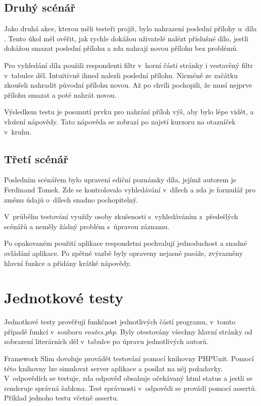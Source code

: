         \subsection{Druhý scénář}
            Jako druhá akce, kterou měli testeři projít, bylo nahrazení poslední přílohy u~díla . Tento úkol měl ověřit, jak rychle dokážou uživatelé nalézt příslušné dílo, jestli dokážou smazat poslední přílohu a zda nahrají novou přílohu bez problémů.
            
            Pro vyhledání díla použili respondenti filtr v~horní části stránky i vestavěný filtr v~tabulce děl. Intuitivně ihned nalezli poslední přílohu. Nicméně ze začátku zkoušeli nahradit původní přílohu novou. Až po chvíli pochopili, že musí nejprve přílohu smazat a poté nahrát novou.

            Výsledkem testu je posunutí prvku pro nahrání příloh výš, aby bylo lépe vidět, a vložení nápovědy. Tato nápověda se zobrazí po najetí kurzoru na otazníček v~kruhu.

        \subsection{Třetí scénář}
            Posledním scénářem bylo upravení ediční poznámky díla, jejímž autorem je Ferdinand Tomek. Zde se kontrolovalo vyhledávání v~dílech a zda je formulář pro změnu údajů o~dílech snadno pochopitelný.
            
            V~průběhu testování využily osoby zkušenosti s~vyhledáváním z~předešlých scénářů a neměly žádný problém s~úpravou záznamu. 
            
            Po opakovaném použití aplikace respondetni pochvalují jednoduchost a snadné ovládání aplikace. Po zpětné vazbě byly opraveny nejasné pasáže, zvýrazněny hlavní funkce a přidány krátké nápovědy.

    \section{Jednotkové testy}
        Jednotkové testy prověřují funkčnost jednotlivých částí programu, v~tomto případě funkcí v~souboru \textit{routes.php}. Byly otestovány všechny hlavní stránky od zobrazení literárních děl v~tabulce po úpravu jednotlivých autorů.
        
        Framework Slim dovoluje provádět testování pomocí knihovny PHPUnit. Pomocí této knihovny lze simulovat server aplikace a posílat na něj požadavky. V~odpovědích se testuje, zda odpověď obsahuje očekávaný html status a jestli se renderuje správná šablona. Test správnosti v~odpovědi se provádí pomocí assertů. Příklad jednoho testu včetně assertu.
        
